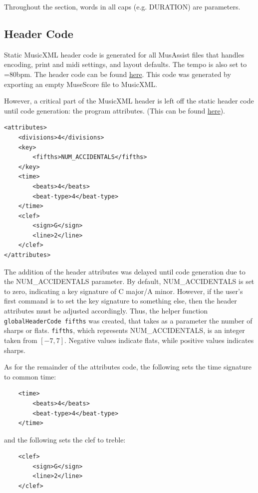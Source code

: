 \documentclass{report}
\begin{document}
\noindent Throughout the section, words in all caps (e.g. DURATION) are parameters.

\subsection{Header Code}
\label{sec:xmlheader}
Static MusicXML header code is generated for all MusAssist files that handles encoding, print and midi settings, and layout defaults. The tempo is also set to \musQuarter=80bpm. The header code can be found \href{https://github.com/ilanashapiro/MusAssist/blob/main/app/Compile.hs}{here}. This code was generated by exporting an empty MuseScore file to MusicXML.

However, a critical part of the MusicXML header is left off the static header code until code generation: the program attributes. (This can be found \href{https://github.com/ilanashapiro/MusAssist/blob/main/app/MusicXMLgen.hs}{here}).

\begin{verbatim}
<attributes>
    <divisions>4</divisions>
    <key>
        <fifths>NUM_ACCIDENTALS</fifths>
    </key>
    <time>
        <beats>4</beats>
        <beat-type>4</beat-type>
    </time>
    <clef>
        <sign>G</sign>
        <line>2</line>
    </clef>
</attributes>
\end{verbatim}

The addition of the header attributes was delayed until code generation due to the NUM\_ACCIDENTALS parameter. By default, NUM\_ACCIDENTALS is set to zero, indicating a key signature of C major/A minor. However, if the user's first command is to set the key signature to something else, then the header attributes must be adjusted accordingly. Thus, the helper function \verb.globalHeaderCode fifths. was created, that takes as a parameter the number of sharps or flats. \verb.fifths., which represents NUM\_ACCIDENTALS, is an integer taken from $[-7,7]$. Negative values indicate flats, while positive values indicates sharps.

As for the remainder of the attributes code, the following sets the time signature to common time:
\begin{verbatim}
    <time>
        <beats>4</beats>
        <beat-type>4</beat-type>
    </time>
\end{verbatim}

\noindent and the following sets the clef to treble:
\begin{verbatim}
    <clef>
        <sign>G</sign>
        <line>2</line>
    </clef>
\end{verbatim}
\end{document}
